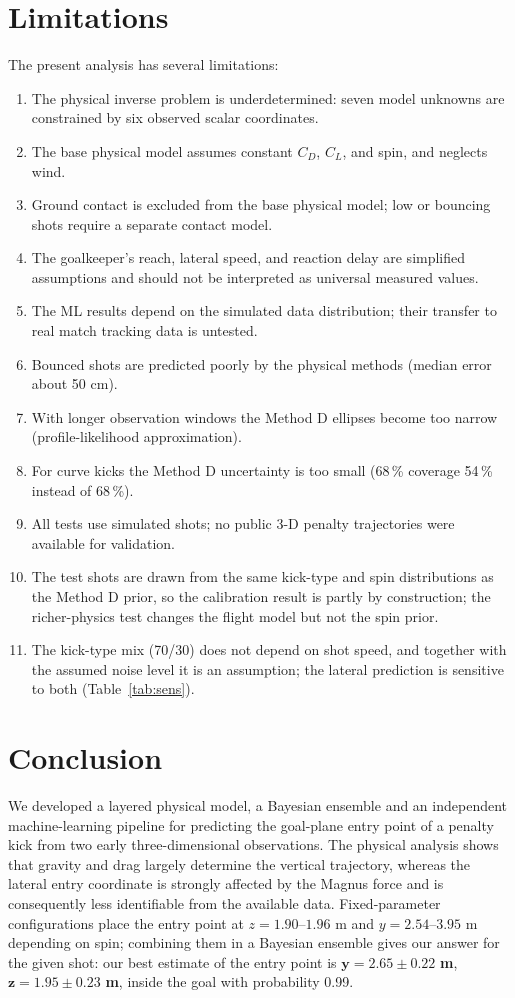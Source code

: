 \documentclass[11pt,a4paper]{article}
\begin{document}
\section{Limitations}
The present analysis has several limitations:
\begin{enumerate}[leftmargin=*]
    \item The physical inverse problem is underdetermined: seven model unknowns are constrained by six observed scalar coordinates.
    \item The base physical model assumes constant $C_D$, $C_L$, and spin, and neglects wind.
    \item Ground contact is excluded from the base physical model; low or bouncing shots require a separate contact model.
    \item The goalkeeper's reach, lateral speed, and reaction delay are simplified assumptions and should not be interpreted as universal measured values.
    \item The ML results depend on the simulated data distribution; their transfer to real match tracking data is untested.
    \item Bounced shots are predicted poorly by the physical methods (median error about 50 cm).
    \item With longer observation windows the Method D ellipses become too narrow (profile-likelihood approximation).
    \item For curve kicks the Method D uncertainty is too small (68\,\% coverage 54\,\% instead of 68\,\%).
    \item All tests use simulated shots; no public 3-D penalty trajectories were available for validation.
    \item The test shots are drawn from the same kick-type and spin distributions as the Method D prior, so the calibration result is partly by construction; the richer-physics test changes the flight model but not the spin prior.
    \item The kick-type mix (70/30) does not depend on shot speed, and together with the assumed noise level it is an assumption; the lateral prediction is sensitive to both (Table~\ref{tab:sens}).
\end{enumerate}

\section{Conclusion}
We developed a layered physical model, a Bayesian ensemble and an independent machine-learning pipeline for predicting the goal-plane entry point of a penalty kick from two early three-dimensional observations. The physical analysis shows that gravity and drag largely determine the vertical trajectory, whereas the lateral entry coordinate is strongly affected by the Magnus force and is consequently less identifiable from the available data. Fixed-parameter configurations place the entry point at $z=1.90$--$1.96$ m and $y=2.54$--$3.95$ m depending on spin; combining them in a Bayesian ensemble gives our answer for the given shot: our best estimate of the entry point is $\bm{y=2.65\pm0.22}$ \textbf{m}, $\bm{z=1.95\pm0.23}$ \textbf{m}, inside the goal with probability 0.99.
\end{document}
